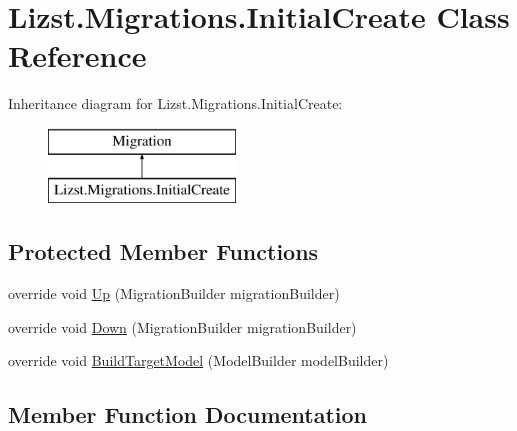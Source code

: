 \hypertarget{class_lizst_1_1_migrations_1_1_initial_create}{}\section{Lizst.\+Migrations.\+Initial\+Create Class Reference}
\label{class_lizst_1_1_migrations_1_1_initial_create}
Inheritance diagram for Lizst.\+Migrations.\+Initial\+Create\+:\begin{figure}[H]
\begin{center}
\leavevmode
\includegraphics[height=2.000000cm]{class_lizst_1_1_migrations_1_1_initial_create}
\end{center}
\end{figure}
\subsection*{Protected Member Functions}
\begin{DoxyCompactItemize}
\item 
override void \mbox{\hyperlink{class_lizst_1_1_migrations_1_1_initial_create_a71c7c103533bd2359ab1599152a0f951}{Up}} (Migration\+Builder migration\+Builder)
\item 
override void \mbox{\hyperlink{class_lizst_1_1_migrations_1_1_initial_create_a7d7e9d7f04c1bcf0bcee5d1ab070a557}{Down}} (Migration\+Builder migration\+Builder)
\item 
override void \mbox{\hyperlink{class_lizst_1_1_migrations_1_1_initial_create_a0f4251cc46e392c9b91ae9b30206e358}{Build\+Target\+Model}} (Model\+Builder model\+Builder)
\end{DoxyCompactItemize}


\subsection{Member Function Documentation}
\mbox{\label{class_lizst_1_1_migrations_1_1_initial_create_a0f4251cc46e392c9b91ae9b30206e358}} 
